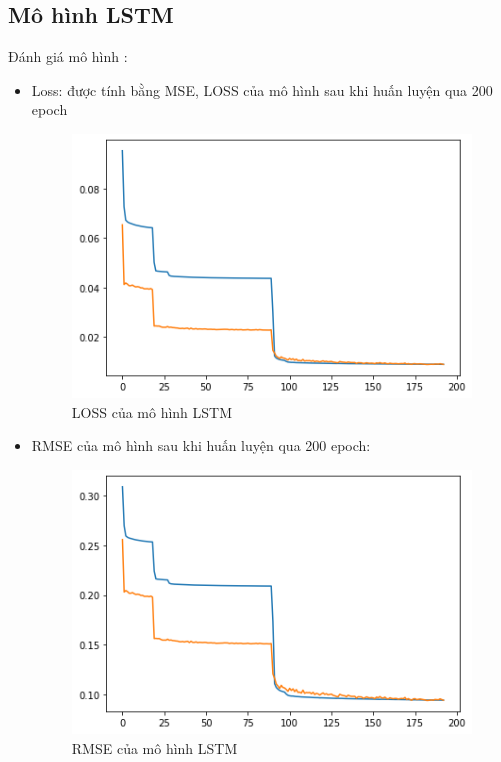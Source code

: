 \subsection{Mô hình LSTM}
Đánh giá mô hình :
\begin{itemize}
    \item Loss: được tính bằng MSE, LOSS của mô hình sau khi huấn luyện qua 200 epoch
    \begin{figure}[H]
    \centering
    \includegraphics[width=.95\textwidth]{figures/LOSS_LSTM.png}
    \caption[LOSS của mô hình LSTM]{LOSS của mô hình LSTM}
    \end{figure}
    \item RMSE của mô hình sau khi huấn luyện qua 200 epoch:
    \begin{figure}[H]
    \centering
    \includegraphics[width=.95\textwidth]{figures/RMSE_LSTM.png}
    \caption[RMSE của mô hình LSTM]{RMSE của mô hình LSTM}
\end{figure}

\end{itemize}
